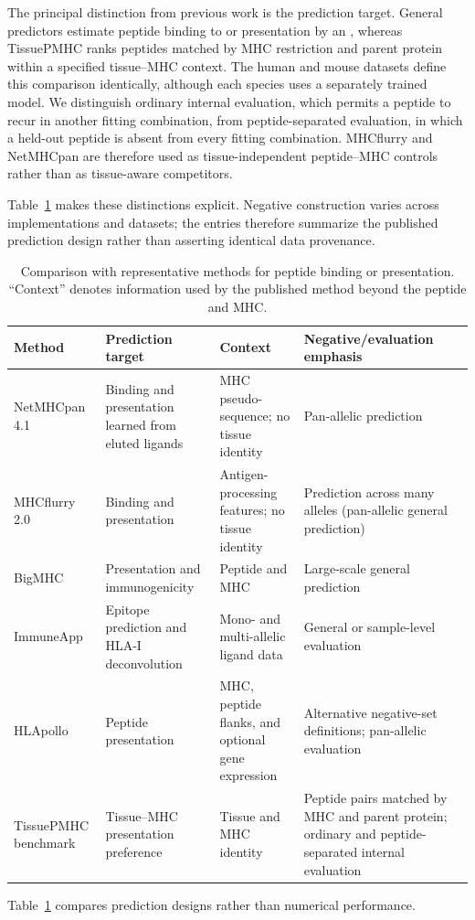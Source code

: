 The principal distinction from previous work is the prediction target. General predictors estimate peptide binding to or presentation by an \plainMHC{}, whereas TissuePMHC ranks peptides matched by MHC restriction and parent protein within a specified tissue--MHC context. The human and mouse datasets define this comparison identically, although each species uses a separately trained model. We distinguish ordinary internal evaluation, which permits a peptide to recur in another fitting combination, from peptide-separated evaluation, in which a held-out peptide is absent from every fitting combination. MHCflurry and NetMHCpan are therefore used as tissue-independent peptide--MHC controls rather than as tissue-aware competitors.

Table~\ref{tab:closest-work} makes these distinctions explicit. Negative construction varies across implementations and datasets; the entries therefore summarize the published prediction design rather than asserting identical data provenance.

\begin{table}[t]
\centering
\caption{Comparison with representative methods for peptide binding or presentation. ``Context'' denotes information used by the published method beyond the peptide and MHC.}
\label{tab:closest-work}
\fontsize{7.5}{8.5}\selectfont
\setlength{\tabcolsep}{2pt}
\begin{tabular}{@{}>{\raggedright\arraybackslash}p{1.8cm}>{\raggedright\arraybackslash}p{2.5cm}>{\raggedright\arraybackslash}p{2.3cm}>{\raggedright\arraybackslash}p{2.6cm}@{}}
\toprule
Method & Prediction target & Context & Negative/evaluation emphasis \\
\midrule
NetMHCpan 4.1 \cite{reynisson2020netmhcpan} & Binding and presentation learned from eluted ligands & MHC pseudo-sequence; no tissue identity & Pan-allelic prediction \\
\midrule
MHCflurry 2.0 \cite{odonnell2020mhcflurry} & Binding and presentation & Antigen-processing features; no tissue identity & Prediction across many alleles (pan-allelic general prediction) \\
\midrule
BigMHC \cite{albert2023bigmhc} & Presentation and immunogenicity & Peptide and MHC & Large-scale general prediction \\
\midrule
ImmuneApp \cite{xu2024immuneapp} & Epitope prediction and HLA-I deconvolution & Mono- and multi-allelic ligand data & General or sample-level evaluation \\
\midrule
HLApollo \cite{thrift2024hlapollo} & Peptide presentation & MHC, peptide flanks, and optional gene expression & Alternative negative-set definitions; pan-allelic evaluation \\
\midrule
TissuePMHC benchmark & Tissue--MHC presentation preference & Tissue and MHC identity & Peptide pairs matched by MHC and parent protein; ordinary and peptide-separated internal evaluation \\
\bottomrule
\end{tabular}
\end{table}

Table~\ref{tab:closest-work} compares prediction designs rather than numerical performance.
